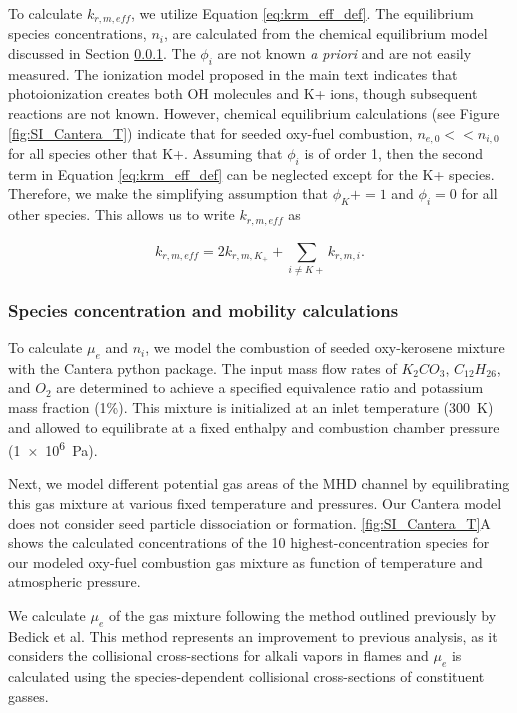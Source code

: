 To calculate $k_{r, m, eff}$, we utilize Equation \ref{eq:krm_eff_def}. The equilibrium species concentrations, $n_i$, are calculated from the chemical equilibrium model discussed in Section \ref{section:species_concentration_mobility_calc}. The $\phi_i$ are not known \emph{a priori} and are not easily measured. The ionization model proposed in the main text indicates that photoionization creates both OH molecules and K+ ions, though subsequent reactions are not known. However, chemical equilibrium calculations (see Figure \ref{fig:SI_Cantera_T}) indicate that for seeded oxy-fuel combustion, $n_{e,0} << n_{i,0}$ for all species other that K+. Assuming that $\phi_i$ is of order 1, then the second term in Equation \ref{eq:krm_eff_def} can be neglected except for the K+ species. Therefore, we make the simplifying assumption that  $\phi_K+ = 1$ and $\phi_i = 0$ for all other species. This allows us to write $k_{r, m, eff}$ as

\begin{equation}
  \label{eq:krm_eff_final}
  k_{r, m, eff} = 2k_{r, m, K_{+}} + \sum_{i \neq K+}^{}k_{r, m, i}.
\end{equation}


\subsubsection{Species concentration and mobility calculations}\label{section:species_concentration_mobility_calc}

To calculate $\mu_e$ and $n_i$, we model the combustion of seeded oxy-kerosene mixture with the Cantera python package. The input mass flow rates of $K_2CO_3$, $C_{12}H_{26}$, and $O_2$ are determined to achieve a specified equivalence ratio and potassium mass fraction (1\%). This mixture is initialized at an inlet temperature (\SI{300}{\kelvin}) and allowed to equilibrate at a fixed enthalpy and combustion chamber pressure (\SI{1e6}{\pascal}).

Next, we model different potential gas areas of the MHD channel by equilibrating this gas mixture at various fixed temperature and pressures. Our Cantera model does not consider seed particle dissociation or formation. \ref{fig:SI_Cantera_T}A shows the calculated concentrations of the 10 highest-concentration species for our modeled oxy-fuel combustion gas mixture as function of temperature and atmospheric pressure.

We calculate $\mu_e$ of the gas mixture following the method outlined previously by Bedick et al.\cite{bedickCombustionPlasmaElectrical2017a} This method represents an improvement to previous analysis, as it considers the collisional cross-sections for alkali vapors in flames and $\mu_e$ is calculated using the species-dependent collisional cross-sections of constituent gasses.


